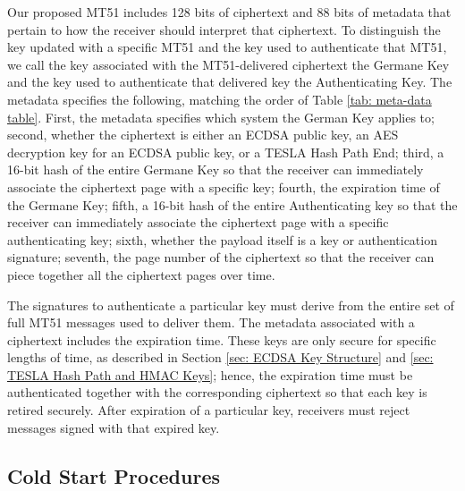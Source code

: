 \documentclass[letterpaper,times]{IONconf/IONconf}
\begin{document}
Our proposed MT51 includes 128 bits of ciphertext and 88 bits of metadata that pertain to how the receiver should interpret that ciphertext.
To distinguish the key updated with a specific MT51 and the key used to authenticate that MT51, we call the key associated with the MT51-delivered ciphertext the Germane Key and the key used to authenticate that delivered key the Authenticating Key.
The metadata specifies the following, matching the order of Table \ref{tab: meta-data table}.
First, the metadata specifies which system the German Key applies to;
second, whether the ciphertext is either an ECDSA public key, an AES decryption key for an ECDSA public key, or a TESLA Hash Path End;
third, a 16-bit hash of the entire Germane Key so that the receiver can immediately associate the ciphertext page with a specific key;
fourth, the expiration time of the Germane Key;
fifth, a 16-bit hash of the entire Authenticating key so that the receiver can immediately associate the ciphertext page with a specific authenticating key;
sixth, whether the payload itself is a key or authentication signature;
seventh, the page number of the ciphertext so that the receiver can piece together all the ciphertext pages over time.

The signatures to authenticate a particular key must derive from the entire set of full MT51 messages used to deliver them.
The metadata associated with a ciphertext includes the expiration time.
These keys are only secure for specific lengths of time, as described in Section \ref{sec: ECDSA Key Structure} and \ref{sec: TESLA Hash Path and HMAC Keys}; hence, the expiration time must be authenticated together with the corresponding ciphertext so that each key is retired securely.
After expiration of a particular key, receivers must reject messages signed with that expired key.

\subsection{Cold Start Procedures}
\end{document}
